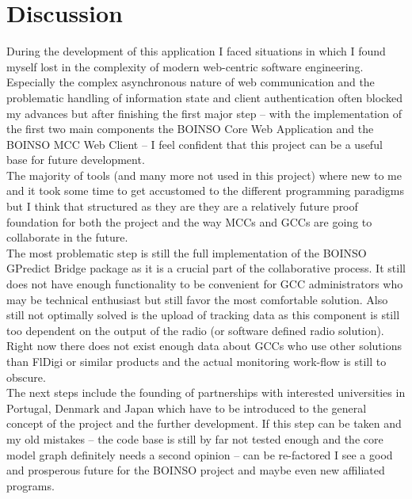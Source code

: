 \documentclass[BachelorPaper]{subfiles}
\begin{document}
\chapter{Discussion}
During the development of this application I faced situations in which I found myself lost in the complexity of modern web-centric software engineering. Especially the complex asynchronous nature of web communication and the problematic handling of information state and client authentication often blocked my advances but after finishing the first major step -- with the implementation of the first two main components the BOINSO Core Web Application and the BOINSO MCC Web Client -- I feel confident that this project can be a useful base for future development. \\

The majority of tools (and many more not used in this project) where new to me and it took some time to get accustomed to the different programming paradigms but I think that structured as they are they are a relatively future proof foundation for both the project and the way \acp{MCC} and \acp{GCC} are going to collaborate in the future. \\

The most problematic step is still the full implementation of the BOINSO GPredict Bridge package as it is a crucial part of the collaborative process. It still does not have enough functionality to be convenient for \ac{GCC} administrators who may be technical enthusiast but still favor the most comfortable solution. Also still not optimally solved is the upload of tracking data as this component is still too dependent on the output of the radio (or software defined radio solution). Right now there does not exist enough data about \acp{GCC} who use other solutions than FlDigi or similar products and the actual monitoring work-flow is still to obscure.\\

The next steps include the founding of partnerships with interested universities in Portugal, Denmark and Japan which have to be introduced to the general concept of the project and the further development. If this step can be taken and my old mistakes -- the code base is still by far not tested enough and the core model graph definitely needs a second opinion -- can be re-factored I see a good and prosperous future for the BOINSO project and maybe even new affiliated programs.\\
\end{document}

